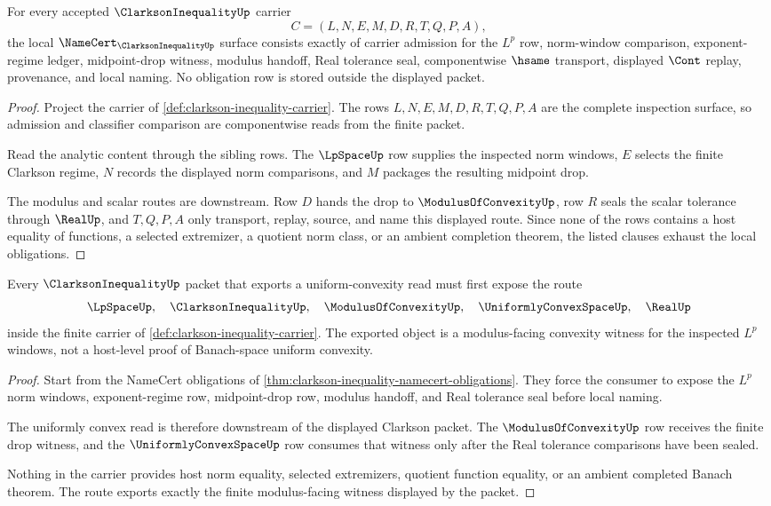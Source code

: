 \begin{theorem}
\label{thm:clarkson-inequality-namecert-obligations}
For every accepted $\ClarksonInequalityUp$ carrier
$$
C=(L,N,E,M,D,R,T,Q,P,A),
$$
the local $\NameCert_{\ClarksonInequalityUp}$ surface consists exactly of carrier admission for the $L^p$ row, norm-window comparison, exponent-regime ledger, midpoint-drop witness, modulus handoff, Real tolerance seal, componentwise $\hsame$ transport, displayed $\Cont$ replay, provenance, and local naming. No obligation row is stored outside the displayed packet.
\end{theorem}
\begin{proof}
Project the carrier of \autoref{def:clarkson-inequality-carrier}. The rows $L,N,E,M,D,R,T,Q,P,A$ are the complete inspection surface, so admission and classifier comparison are componentwise reads from the finite packet.

Read the analytic content through the sibling rows. The $\LpSpaceUp$ row supplies the inspected norm windows, $E$ selects the finite Clarkson regime, $N$ records the displayed norm comparisons, and $M$ packages the resulting midpoint drop.

The modulus and scalar routes are downstream. Row $D$ hands the drop to $\ModulusOfConvexityUp$, row $R$ seals the scalar tolerance through $\RealUp$, and $T,Q,P,A$ only transport, replay, source, and name this displayed route. Since none of the rows contains a host equality of functions, a selected extremizer, a quotient norm class, or an ambient completion theorem, the listed clauses exhaust the local obligations.
\end{proof}

\begin{theorem}
\label{thm:clarkson-inequality-uniform-convexity-route}
Every $\ClarksonInequalityUp$ packet that exports a uniform-convexity read must first expose the route
$$
\LpSpaceUp,\quad \ClarksonInequalityUp,\quad \ModulusOfConvexityUp,\quad \UniformlyConvexSpaceUp,\quad \RealUp
$$
inside the finite carrier of \autoref{def:clarkson-inequality-carrier}. The exported object is a modulus-facing convexity witness for the inspected $L^p$ windows, not a host-level proof of Banach-space uniform convexity.
\end{theorem}
\begin{proof}
Start from the NameCert obligations of \autoref{thm:clarkson-inequality-namecert-obligations}. They force the consumer to expose the $L^p$ norm windows, exponent-regime row, midpoint-drop row, modulus handoff, and Real tolerance seal before local naming.

The uniformly convex read is therefore downstream of the displayed Clarkson packet. The $\ModulusOfConvexityUp$ row receives the finite drop witness, and the $\UniformlyConvexSpaceUp$ row consumes that witness only after the Real tolerance comparisons have been sealed.

Nothing in the carrier provides host norm equality, selected extremizers, quotient function equality, or an ambient completed Banach theorem. The route exports exactly the finite modulus-facing witness displayed by the packet.
\end{proof}

